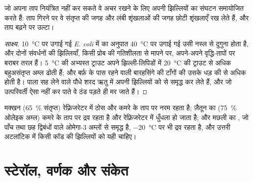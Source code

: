 \begin{proposition}[समश्यानता अनुकूलन]\label{prop:b1:lipids:homeoviscous}
जो  अपना ताप नियंत्रित नहीं कर सकते वे  अचर रखने के लिए अपनी
झिल्लियों का संघटन समायोजित करते हैं: ताप गिरने पर वे संतृप्त की जगह
 और लंबी शृंखलाओं की जगह छोटी शृंखलाएँ रख लेते हैं, और
ताप बढ़ने पर उल्टा।
\end{proposition}
\begin{proof}[साक्ष्य]
\qty{10}{\celsius} पर उगाई गई \emph{E. coli} में   का
अनुपात \qty{40}{\celsius} पर उगाई गई उसी नस्ल से दुगुना होता है,
और दोनों संवर्धनों की झिल्लियाँ, किसी प्रोब की गतिशीलता से मापने पर,
अपने-अपने वृद्धि-तापों पर बराबर तरल हैं। \qty{5}{\celsius} की अभ्यस्त
ट्राउट अपने झिल्ली-लिपिडों में \qty{20}{\celsius} की ट्राउट से अधिक
बहुअसंतृप्त अम्ल ढोती हैं; और बर्फ़ के पास रहने वाली बारहसिंगे की टाँगों
की  उसके धड़ की  से अधिक  होती है। पाला सह लेने वाले पौधे
शरद ऋतु में अपनी झिल्लियों को   से समृद्ध कर लेते हैं, और
जो उत्परिवर्ती ऐसा नहीं कर पाते वे ठंड पड़ते ही मर जाते हैं।
\end{proof}

\begin{example}[मक्खन, ज़ैतून का तेल, मछली का तेल]\label{ex:b1:lipids:kitchen}
मक्खन (\qty{65}{\%} संतृप्त) रेफ़्रिजरेटर में ठोस और कमरे के ताप पर नरम
रहता है; ज़ैतून का  (\qty{75}{\%} ओलेइक अम्ल) कमरे के ताप पर द्रव
रहता है और रेफ़्रिजरेटर में धुँधला हो जाता है; और मछली का , जो पाँच
तथा छह द्विबंधों वाले ओमेगा-3 अम्लों से समृद्ध है, \qty{-20}{\celsius}
पर भी द्रव रहता है, और उत्तरी अटलांटिक में किसी कॉड की झिल्लियों को यही
चाहिए।
\end{example}

\section{स्टेरॉल, वर्णक और संकेत}

